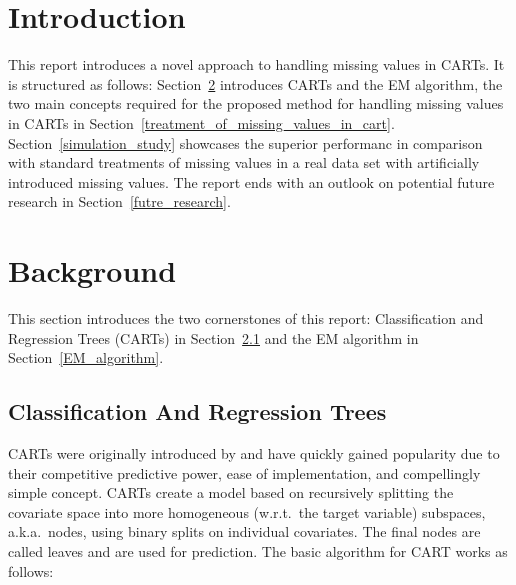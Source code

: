 \documentclass[12pt, twoside]{article}
\newcommand{\1}{\mathbb{1}}
\begin{document}
\section{Introduction}
This report introduces a novel approach to handling missing values in CARTs. It is structured as follows: Section~\ref{background} introduces CARTs and the EM algorithm, the two main concepts required for the proposed method for handling missing values in CARTs in Section~\ref{treatment_of_missing_values_in_cart}. Section~\ref{simulation_study} showcases the superior performanc in comparison with standard treatments of missing values in a real data set with artificially introduced missing values. The report ends with an outlook on potential future research in Section~\ref{futre_research}.

\section{Background}\label{background}
This section introduces the two cornerstones of this report: Classification and Regression Trees (CARTs) in Section~\ref{CART} and the EM algorithm in Section~\ref{EM_algorithm}. 

\subsection{Classification And Regression Trees}\label{CART}
CARTs were originally introduced by \cite{breiman1984} and have quickly gained popularity due to their competitive predictive power, ease of implementation, and compellingly simple concept.
CARTs create a model based on recursively splitting the covariate space into more homogeneous (w.r.t.\ the target variable) subspaces, a.k.a.\ nodes, using binary splits on individual covariates. The final nodes are called leaves and are used for prediction.
The basic algorithm for CART works as follows: \\

\\
\end{document}
